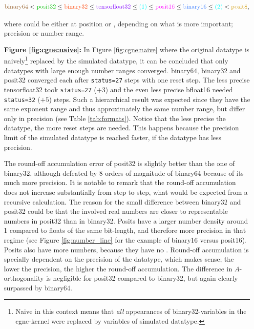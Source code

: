 \documentclass{article}
\theoremstyle{plain} %
\theoremstyle{convention} %
\theoremstyle{remark} %
\def\code#1{\texttt{#1}}
\numberwithin{equation}{section}
\begin{document}
\begin{align}
    \textcolor{cbrown}{\text{binary64}} < \textcolor{cgreen}{\text{posit32}} \leq \textcolor{cred}{\text{binary32}} \leq \textcolor{cpurple}{\text{tensorfloat32}} \leq \textcolor{cturquois}{\text{(1)}} \leq \textcolor{cpink}{\text{posit16}} \leq \textcolor{cblue}{\text{binary16}} \leq \textcolor{cturquois}{\text{(2)}} < \textcolor{cyellow}{\text{posit8}}, \label{eq:hierarchy}
\end{align}

where \textcolor{cturquois}{} could be either at position \textcolor{cturquois}{} or \textcolor{cturquois}{}, depending on what is more important; precision or number range.

\textbf{Figure \ref{fig:cgne:naive}:} In Figure \ref{fig:cgne:naive} where the original datatype is naively\footnote{Naive in this context means that \textit{all} appearances of binary32-variables in the cgne-kernel were replaced by variables of simulated datatype.} replaced by the simulated datatype, it can be concluded that only datatypes with large enough number ranges converged. \gls{binary64}, \gls{binary32} and \gls{posit32} converged each after \code{status=27} steps with one reset step. The less precise \gls{tensorfloat32} took \code{status=27} ($+3$) and the even less precise \gls{bfloat16} needed \code{status=32} ($+5$) steps. Such a hierarchical result was expected since they have the same exponent range and thus approximately the same number range, but differ only in precision (see Table \ref{tab:formats}). Notice that the less precise the datatype, the more reset steps are needed. This happens because the precision limit of the simulated datatype is reached faster, if the datatype has less precision.

The round-off accumulation error of \gls{posit32} is slightly better than the one of \gls{binary32}, although defeated by $8$ orders of magnitude of \gls{binary64} because of its much more precision. It is notable to remark that the round-off accumulation does not increase substantially from step to step, what would be expected from a recursive calculation. The reason for the small difference between \gls{binary32} and \gls{posit32} could be that the involved real numbers are closer to representable numbers in \gls{posit32} than in \gls{binary32}. Posits have a larger number density around \num{1} compared to floats of the same bit-length, and therefore more precision in that regime (see Figure \ref{fig:number_line} for the example of \gls{binary16} versus \gls{posit16}). Posits also have more numbers, because they have no . Round-off accumulation is specially dependent on the precision of the datatype, which makes sense; the lower the precision, the higher the round-off accumulation. The difference in $A$-orthogonality is negligible for \gls{posit32} compared to \gls{binary32}, but again clearly surpassed by \gls{binary64}.
\end{document}
